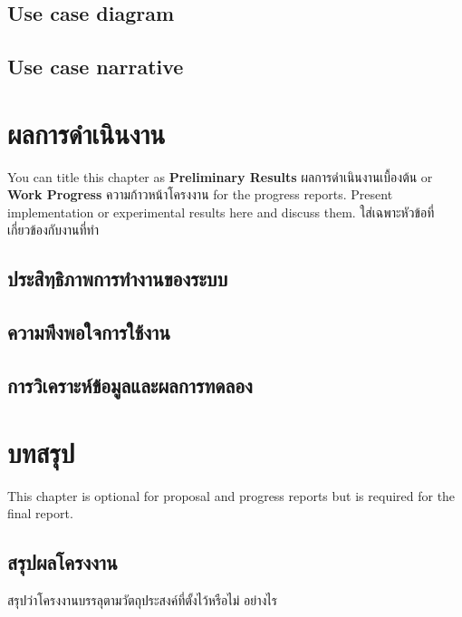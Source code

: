 \documentclass[12pt,oneside,openright,a4paper]{cpe-thai-project}
\begin{document}
\section{Use case diagram}


\section{Use case narrative}




\chapter{ผลการดำเนินงาน}

You can title this chapter as \textbf{Preliminary Results} ผลการดำเนินงานเบื้องต้น or \textbf{Work Progress} ความก้าวหน้าโครงงาน for the progress reports. Present implementation or experimental results here and discuss them.
ใส่เฉพาะหัวข้อที่เกี่ยวข้องกับงานที่ทำ 

\section{ประสิทฺธิภาพการทำงานของระบบ} 
\section{ความพึงพอใจการใช้งาน}
\section{การวิเคราะห์ข้อมูลและผลการทดลอง}

\chapter{บทสรุป}

This chapter is optional for proposal and progress reports but 
is required for the final report.

\section{สรุปผลโครงงาน}
สรุปว่าโครงงานบรรลุตามวัตถุประสงค์ที่ตั้งไว้หรือไม่ อย่างไร 
\end{document}

